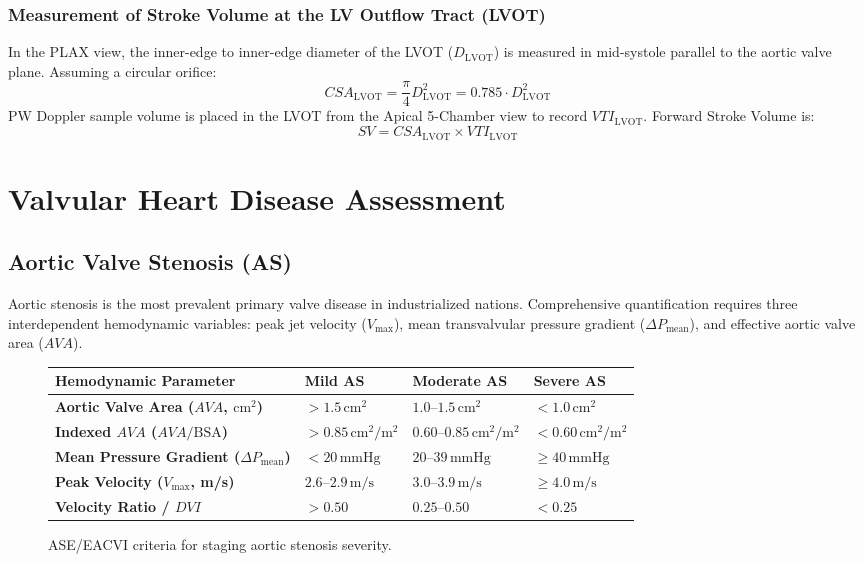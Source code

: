 \documentclass[11pt,a4paper]{article}
\begin{document}
\subsubsection{Measurement of Stroke Volume at the LV Outflow Tract (LVOT)}
In the PLAX view, the inner-edge to inner-edge diameter of the LVOT ($D_{\text{LVOT}}$) is measured in mid-systole parallel to the aortic valve plane. Assuming a circular orifice:
\begin{equation}
    CSA_{\text{LVOT}} = \frac{\pi}{4} D_{\text{LVOT}}^2 = 0.785 \cdot D_{\text{LVOT}}^2
\end{equation}
PW Doppler sample volume is placed in the LVOT from the Apical 5-Chamber view to record $VTI_{\text{LVOT}}$. Forward Stroke Volume is:
\begin{equation}
    SV = CSA_{\text{LVOT}} \times VTI_{\text{LVOT}}
\end{equation}

\newpage
\section{Valvular Heart Disease Assessment}

\subsection{Aortic Valve Stenosis (AS)}

Aortic stenosis is the most prevalent primary valve disease in industrialized nations. Comprehensive quantification requires three interdependent hemodynamic variables: peak jet velocity ($V_{\text{max}}$), mean transvalvular pressure gradient ($\Delta P_{\text{mean}}$), and effective aortic valve area ($AVA$).

\begin{figure}[htbp]
\centering
\setlength{\tabcolsep}{4pt}
\begin{tabular}{p{3.8cm}p{3.2cm}p{3.6cm}p{3.8cm}}
\toprule
\textbf{Hemodynamic Parameter} & \textbf{Mild AS} & \textbf{Moderate AS} & \textbf{Severe AS} \\
\midrule
\textbf{Aortic Valve Area ($AVA$, $\text{cm}^2$)} & $> 1.5\,\text{cm}^2$ & $1.0\text{--}1.5\,\text{cm}^2$ & $< 1.0\,\text{cm}^2$ \\
\textbf{Indexed $AVA$ ($AVA / \text{BSA}$)} & $> 0.85\,\text{cm}^2/\text{m}^2$ & $0.60\text{--}0.85\,\text{cm}^2/\text{m}^2$ & $< 0.60\,\text{cm}^2/\text{m}^2$ \\
\textbf{Mean Pressure Gradient ($\Delta P_{\text{mean}}$)} & $< 20\,\text{mmHg}$ & $20\text{--}39\,\text{mmHg}$ & $\ge 40\,\text{mmHg}$ \\
\textbf{Peak Velocity ($V_{\text{max}}$, m/s)} & $2.6\text{--}2.9\,\text{m/s}$ & $3.0\text{--}3.9\,\text{m/s}$ & $\ge 4.0\,\text{m/s}$ \\
\textbf{Velocity Ratio / $DVI$} & $> 0.50$ & $0.25\text{--}0.50$ & $< 0.25$ \\
\bottomrule
\end{tabular}
\caption{ASE/EACVI criteria for staging aortic stenosis severity.}
\label{tab:as_staging}
\end{figure}
\end{document}
